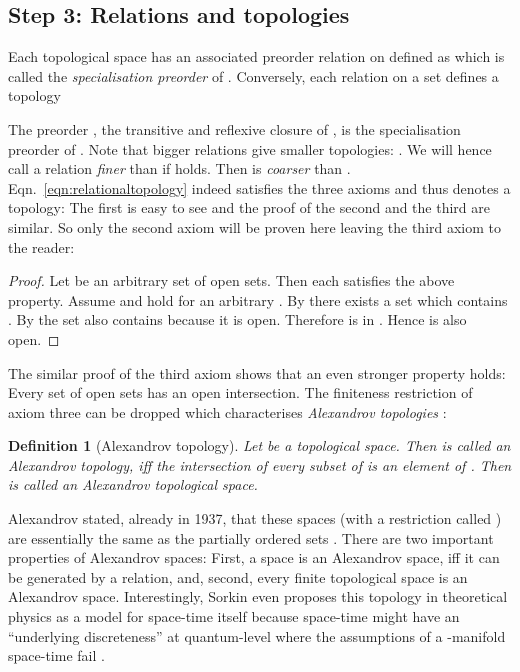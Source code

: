 \documentclass[5p]{elsarticle}
\newtheorem{dfn}{Definition}
\newcommand{\qq}[1]{``#1''}
\begin{document}
\subsection{Step 3: Relations and topologies}

Each topological space  has an associated preorder relation 
 on  defined as  which 
is called the \emph{specialisation preorder} of . 
Conversely, each relation  on a set  defines a topology 

The preorder , the transitive and reflexive closure of , is the specialisation preorder 
of . 
Note that bigger relations give smaller topologies: 
. 
We will hence call a relation  \emph{finer} than  if  holds. 
Then  is \emph{coarser} than .
Eqn.~\ref{eqn:relationaltopology} indeed satisfies the three axioms and thus denotes a topology: 
The first is easy to see and the proof of the second and the third are similar. So only the 
second axiom will be proven here leaving the third axiom to the reader: 

\begin{proof}
Let  be an arbitrary set of open sets. 
Then each satisfies the above property. 
Assume  and  hold for an arbitrary . 
By  there exists a set  which contains . 
By  the set  also contains  because it is open. 
Therefore  is in . 
Hence  is also open. 
\end{proof}

The similar proof of the third axiom shows that an even stronger property holds: 
Every set of open sets has an open intersection. The finiteness restriction of 
axiom three can be dropped which characterises \emph{Alexandrov topologies} \cite{Alexandroff}:

\begin{dfn}[Alexandrov topology]
Let  be a topological space. 
Then  is called an \emph{Alexandrov topology}, iff 
the intersection  of every subset 
 of  is an element of . 
Then  is called an \emph{Alexandrov topological space}. 
\end{dfn}

Alexandrov stated, already in 1937, that these spaces (with a restriction called ) 
are essentially the same as the partially ordered sets . 
There are two important properties of Alexandrov spaces: 
First, a space is an Alexandrov space, iff it can be generated by a relation, and, 
second, every finite topological space is an Alexandrov space. 
Interestingly, Sorkin even proposes this topology in theoretical physics 
as a model for space-time itself because space-time might have an \qq{underlying discreteness} at 
quantum-level where the assumptions of a -manifold space-time fail \cite{Sorkin:FinTop}. 
\end{document}
